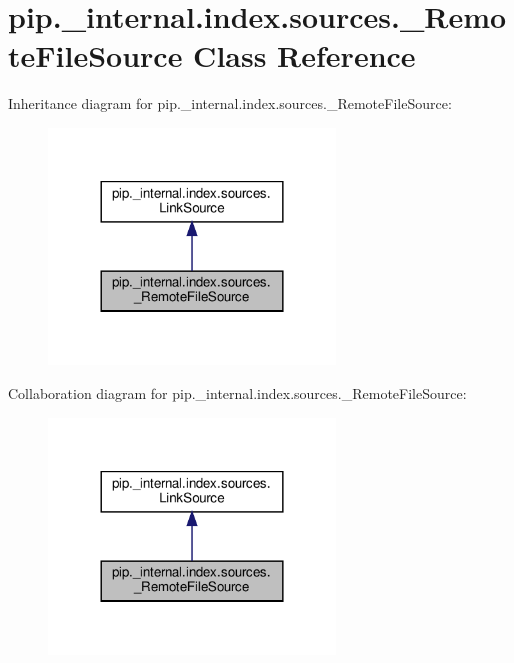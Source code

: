 \hypertarget{classpip_1_1__internal_1_1index_1_1sources_1_1__RemoteFileSource}{}\section{pip.\+\_\+internal.\+index.\+sources.\+\_\+\+Remote\+File\+Source Class Reference}
\label{classpip_1_1__internal_1_1index_1_1sources_1_1__RemoteFileSource}


Inheritance diagram for pip.\+\_\+internal.\+index.\+sources.\+\_\+\+Remote\+File\+Source\+:
\nopagebreak
\begin{figure}[H]
\begin{center}
\leavevmode
\includegraphics[width=216pt]{classpip_1_1__internal_1_1index_1_1sources_1_1__RemoteFileSource__inherit__graph}
\end{center}
\end{figure}


Collaboration diagram for pip.\+\_\+internal.\+index.\+sources.\+\_\+\+Remote\+File\+Source\+:
\nopagebreak
\begin{figure}[H]
\begin{center}
\leavevmode
\includegraphics[width=216pt]{classpip_1_1__internal_1_1index_1_1sources_1_1__RemoteFileSource__coll__graph}
\end{center}
\end{figure}
